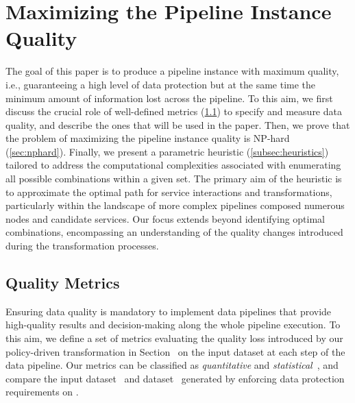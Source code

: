 \section{Maximizing the Pipeline Instance Quality}\label{sec:heuristics}
    
The goal of this paper is to produce a pipeline instance with maximum quality, i.e., guaranteeing a high level of data protection but at the same time the minimum amount of information lost across the pipeline. To this aim, we first discuss the crucial role of well-defined metrics (\cref{sec:metrics}) to specify and measure data quality, and describe the ones that will be used in the paper. 
Then, we prove that the problem of maximizing the pipeline instance quality is NP-hard (\cref{sec:nphard}). Finally, we present a parametric heuristic (\cref{subsec:heuristics}) tailored to address the computational complexities associated with enumerating all possible combinations within a given set. The primary aim of the heuristic is to approximate the optimal path for service interactions and transformations, particularly within the landscape of more complex pipelines composed numerous nodes and candidate services.
Our focus extends beyond identifying optimal combinations, encompassing an understanding of the quality changes introduced during the transformation processes.


\subsection{Quality Metrics}\label{sec:metrics}
Ensuring data quality is mandatory to implement data pipelines that provide high-quality results and decision-making along the whole pipeline execution. To this aim, we define a set of metrics evaluating the quality loss introduced by our policy-driven transformation in Section~\cite{ADD} on the input dataset \origdataset at each step of the data pipeline. Our metrics can be classified as \emph{quantitative} and \emph{statistical}~\cite{ADD}, and compare the input dataset \origdataset\ and dataset \transdataset\ generated by enforcing data protection requirements on \origdataset. 

